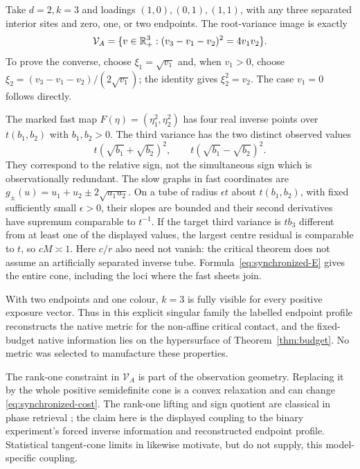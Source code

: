 \begin{example}\label{ex:synchronized-critical}
Take $d=2,k=3$ and loadings $(1,0),(0,1),(1,1)$, with any three separated interior sites and zero, one, or two endpoints. The root-variance image is exactly
\[
 \mathcal V_A=\{v\in\mathbb R_+^3:(v_3-v_1-v_2)^2=4v_1v_2\}.
\]
To prove the converse, choose $\xi_1=\sqrt{v_1}$ and, when $v_1>0$, choose $\xi_2=(v_3-v_1-v_2)/(2\sqrt{v_1})$; the identity gives $\xi_2^2=v_2$. The case $v_1=0$ follows directly.

The marked fast map $F(\eta)=(\eta_1^2,\eta_2^2)$ has four real inverse points over $t(b_1,b_2)$ with $b_1,b_2>0$. The third variance has the two distinct observed values
\[
 t(\sqrt{b_1}+\sqrt{b_2})^2,
 \qquad t(\sqrt{b_1}-\sqrt{b_2})^2.
\]
They correspond to the relative sign, not the simultaneous sign which is observationally redundant. The slow graphs in fast coordinates are
$g_\pm(u)=u_1+u_2\pm2\sqrt{u_1u_2}$.
On a tube of radius $\epsilon t$ about $t(b_1,b_2)$, with fixed sufficiently small $\epsilon>0$, their slopes are bounded and their second derivatives have supremum comparable to $t^{-1}$. If the target third variance is $tb_3$ different from at least one of the displayed values, the largest centre residual is comparable to $t$, so $cM\asymp1$. Here $c/r$ also need not vanish: the critical theorem does not assume an artificially separated inverse tube. Formula~\eqref{eq:synchronized-E} gives the entire cone, including the loci where the fast sheets join.

With two endpoints and one colour, $k=3$ is fully visible for every positive exposure vector. Thus in this explicit singular family the labelled endpoint profile reconstructs the native metric for the non-affine critical contact, and the fixed-budget native information lies on the hypersurface of Theorem~\ref{thm:budget}. No metric was selected to manufacture these properties.
\end{example}

\begin{remark}
The rank-one constraint in $\mathcal V_A$ is part of the observation geometry. Replacing it by the whole positive semidefinite cone is a convex relaxation and can change \eqref{eq:synchronized-cost}. The rank-one lifting and sign quotient are classical in phase retrieval \cite{BCE,CSV}; the claim here is the displayed coupling to the binary experiment's forced inverse information and reconstructed endpoint profile. Statistical tangent-cone limits in \cite{Drton} likewise motivate, but do not supply, this model-specific coupling.
\end{remark}
